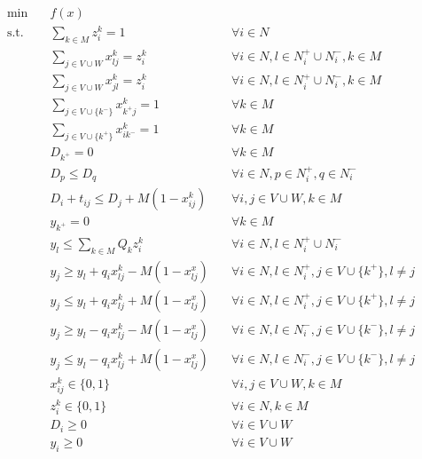 				\begin{align}
					\min \quad & f(x) &\\
					\text{s.t.} \quad & \sum_{k \in M} z_i^k = 1 \quad & \forall i \in N \label{PDP:con:vehAss}\\
					& \sum_{j\in V\cup W} x_{lj}^k = z_i^k \quad & \forall i \in N, l\in N_i^+ \cup N_i^-, k \in M \label{PDP:con:routeAss1}\\
					& \sum_{j\in V\cup W} x_{jl}^k = z_i^k \quad & \forall i \in N, l\in N_i^+ \cup N_i^-, k \in M \label{PDP:con:routeAss2}\\
					& \sum_{j \in V \cup \{k^-\}}x_{k^+j}^k = 1 \quad & \forall k \in M \label{PDP:con:leaveDepot}\\
					& \sum_{j \in V \cup \{k^+\}}x_{ik^-}^k = 1 \quad & \forall k \in M \label{PDP:con:arriveDepot}\\
					& D_{k^+} = 0 \quad & \forall k \in M \label{PDP:con:initTime}\\
					& D_p \le D_q \quad & \forall i \in N, p \in N_i^+, q \in N_i^- \label{PDP:con:pdOrder}\\
					& D_i + t_{ij} \le D_j + M(1 - x_{ij}^k) \quad & \forall i, j \in V\cup W, k \in M \label{PDP:con:travelDist} \\
					& y_{k^+} = 0 \quad & \forall k \in M \label{PDP:con:initLoad}\\
					& y_l \le \sum_{k \in M} Q_k z_i^k \quad & \forall i \in N, l \in N_i^+\cup N_i^- \label{PDP:con:maxLoad} \\
					& y_j \ge y_l + q_i x_{lj}^k - M(1 - x_{lj}^x) \quad & \forall i \in N, l\in N_i^+, j \in V\cup \{k^+\}, l \neq j \label{PDP:con:loadChange1}\\
					& y_j \le y_l + q_i x_{lj}^k + M(1 - x_{lj}^x) \quad & \forall i \in N, l\in N_i^+, j \in V\cup \{k^+\}, l \neq j \label{PDP:con:loadChange2}\\
					& y_j \ge y_l - q_i x_{lj}^k - M(1 - x_{lj}^x) \quad & \forall i \in N, l\in N_i^-, j \in V\cup \{k^-\}, l \neq j \label{PDP:con:loadChange3}\\
					& y_j \le y_l - q_i x_{lj}^k + M(1 - x_{lj}^x) \quad & \forall i \in N, l\in N_i^-, j \in V\cup \{k^-\}, l \neq j \label{PDP:con:loadChange4}\\
					& x_{ij}^k \in \{0, 1\} \quad & \forall i, j \in V \cup W, k\in M \label{PDP:con:binary1}\\
					& z_i^k \in \{0, 1\} \quad & \forall i \in N, k \in M \label{PDP:con:binary2}\\
					& D_i \ge 0 \quad & \forall i \in V\cup W \label{PDP:con:nonneg1}\\
					& y_i \ge 0 \quad & \forall i \in V\cup W \label{PDP:con:nonneg2}
				\end{align}

